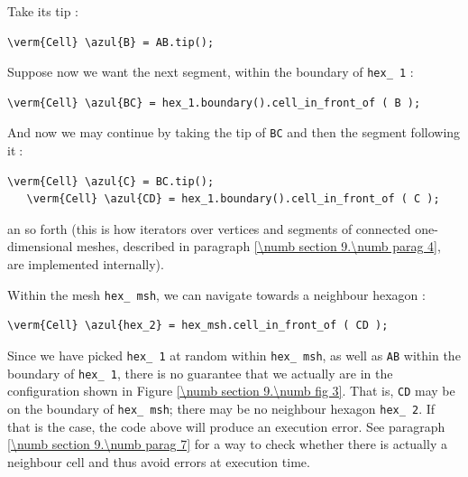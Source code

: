 Take its tip :

\begin{Verbatim}[commandchars=\\\{\},formatcom=\small\tt,
   baselinestretch=0.94,framesep=2mm                      ]
   \verm{Cell} \azul{B} = AB.tip();
\end{Verbatim}

Suppose now we want the next segment, within the boundary of {\small\tt hex\_\,1} :

\begin{Verbatim}[commandchars=\\\{\},formatcom=\small\tt,
   baselinestretch=0.94,framesep=2mm                      ]
   \verm{Cell} \azul{BC} = hex_1.boundary().cell_in_front_of ( B );
\end{Verbatim}

And now we may continue by taking the tip of {\small\tt BC} and then the segment
following it$\;$:

\begin{Verbatim}[commandchars=\\\{\},formatcom=\small\tt,
   baselinestretch=0.94,framesep=2mm                      ]
   \verm{Cell} \azul{C} = BC.tip();
   \verm{Cell} \azul{CD} = hex_1.boundary().cell_in_front_of ( C );
\end{Verbatim}

\noindent an so forth (this is how iterators over vertices and segments of connected
one-dimensional meshes, described in paragraph \ref{\numb section 9.\numb parag 4},
are implemented internally).

Within the mesh {\small\tt hex\_\,msh}, we can navigate towards a neighbour hexagon :

\begin{Verbatim}[commandchars=\\\{\},formatcom=\small\tt,
   baselinestretch=0.94,framesep=2mm                      ]
   \verm{Cell} \azul{hex_2} = hex_msh.cell_in_front_of ( CD );
\end{Verbatim}

Since we have picked {\small\tt hex\_\,1} at random within {\small\tt hex\_\,msh},
as well as {\small\tt AB} within the boundary of {\small\tt hex\_\,1},
there is no guarantee that we actually are in the configuration shown in
Figure \ref{\numb section 9.\numb fig 3}.
That is, {\small\tt CD} may be on the boundary of {\small\tt hex\_\,msh};
there may be no neighbour hexagon {\small\tt hex\_\,2}.
If that is the case, the code above will produce an execution error.
See paragraph \ref{\numb section 9.\numb parag 7} for a way to check whether there is actually
a neighbour cell and thus avoid errors at execution time.

